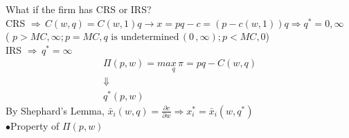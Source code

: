\documentclass[letterpaper,13pt,single,pdftex]{scrartcl}
\begin{document}
What if the firm has CRS or IRS?\\
CRS $\Rightarrow \, C(w,q) = C(w,1)q \rightarrow x= pq-c = (p-c(w,1))q \Rightarrow q^* = 0, \infty $\\
( $p>MC, \infty ; p = MC, q \text{ is undetermined}\,(0 \, ,\infty) ; p< MC, 0$)\\
IRS $\Rightarrow \, q^* = \infty$
\begin{gather*}
    \Pi(p,w) = max\limits_{q} \, \pi = pq - C(w,q)\\
    \Downarrow\\
    q^*(p,w)
\end{gather*}
By Shephard's Lemma, $\bar{x}_i(w,q) = \frac{\partial c}{\partial w} \Rightarrow x_i^* = \bar{x}_i(w,q^*)$\\

$\bullet$Property of $\Pi(p,w)$\\
\end{document}
